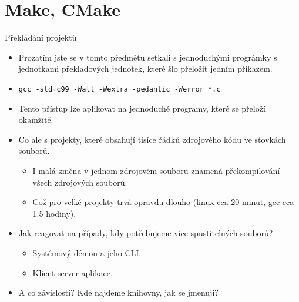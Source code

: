 \documentclass[handout]{beamer}
\begin{document}
\section{Make, CMake}
\begin{frame}{Překládání projektů}
    \begin{itemize}
        \item Prozatím jste se v tomto předmětu setkali s jednoduchými prográmky s jednotkami
            překladových jednotek, které šlo přeložit jedním příkazem.
        \item \texttt{gcc -std=c99 -Wall -Wextra -pedantic -Werror *.c}
        \item<2-> Tento přístup lze aplikovat na jednoduché programy, které se přeloží okamžitě.
        \item<3-> Co ale s projekty, které obsahují tisíce řádků zdrojového kódu ve stovkách souborů.
        \begin{itemize}
            \item<4-> I malá změna v jednom zdrojovém souboru znamená překompilování všech zdrojových souborů.
            \item<4-> Což pro velké projekty trvá opravdu dlouho (linux cca 20 minut, gcc cca 1.5 hodiny).
        \end{itemize}
        \item<5-> Jak reagovat na případy, kdy potřebujeme více spustitelných souborů?
            \begin{itemize}
                \item<6-> Systémový démon a jeho CLI.
                \item<6-> Klient server aplikace.
            \end{itemize}
        \item<6-> A co závislosti? Kde najdeme knihovny, jak se jmenuji?
    \end{itemize}
\end{frame}
\end{document}
